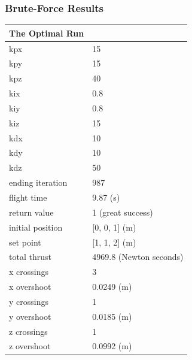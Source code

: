 \documentclass{beamer}
\begin{document}
\begin{frame}

\frametitle{Brute-Force Results}
{\scriptsize
\begin{table}\label{table:optimalrun}

\centering
\begin{tabular}{l l}
The Optimal Run      \\
\hline
kpx                 & 15 \\
kpy                 & 15 \\
kpz                 & 40 \\
kix                 & 0.8 \\
kiy                 & 0.8 \\
kiz                 & 15 \\
kdx                 & 10 \\
kdy                 & 10 \\
kdz                 & 50 \\
ending iteration    & 987 \\
flight time         & 9.87 (s) \\
return value        & 1 (great success)\\
initial position    & [0, 0, 1] (m)\\
set point           & [1, 1, 2] (m) \\
total thrust        & 4969.8 (Newton seconds) \\
x crossings         & 3 \\
x overshoot         & 0.0249 (m) \\
y crossings         & 1 \\
y overshoot         & 0.0185 (m)\\
z crossings         & 1 \\
z overshoot         & 0.0992 (m) \\
\end{tabular}

\end{table}
}

\end{frame}
\end{document}
